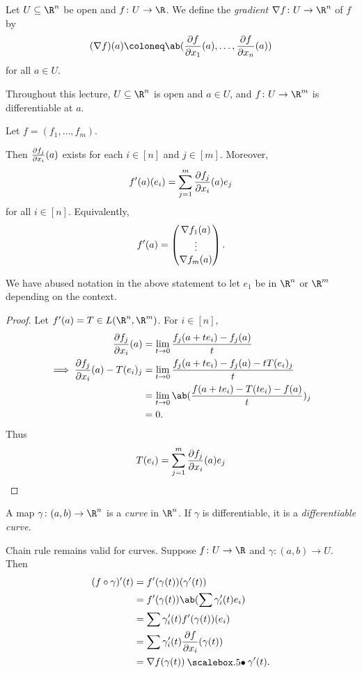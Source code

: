 \begin{definition}[gradient] \label{def:gradient}
    Let $U \subseteq \R^n$ be open and $f\colon U \to \R$.
    We define the \emph{gradient} $\grad f\colon U \to \R^n$ of $f$ by \[
        (\grad f)(a) \coloneq
        \ab(\pdv{f}{x_1}(a), \ldots, \pdv{f}{x_n}(a))
    \] for all $a \in U$.
\end{definition}
Throughout this lecture, $U \subseteq \R^n$ is open and $a \in U$,
and $f\colon U \to \R^m$ is differentiable at $a$.

\begin{proposition}
    Let $f = (f_1, \dots, f_m)$.

    Then $\pdv{f_j}{x_i}(a)$ exists for each $i \in [n]$ and $j \in [m]$.
    Moreover, \[
        f'(a)(e_i) = \sum_{j=1}^m \pdv{f_j}{x_i}(a) e_j
    \] for all $i \in [n]$.
    Equivalently, \[
        f'(a) = \begin{pmatrix}
            \nabla f_1(a) \\
            \vdots \\
            \nabla f_m(a)
        \end{pmatrix}.
    \]
\end{proposition}
We have abused notation in the above statement to let $e_1$ be in
$\R^n$ or $\R^m$ depending on the context.
\begin{proof}
    Let $f'(a) = T \in L(\R^n, \R^m)$.
    For $i \in [n]$, \begin{align*}
        \pdv{f_j}{x_i}(a)
            &= \lim_{t \to 0} \frac{f_j(a+te_i) - f_j(a)}{t} \\
        \implies \pdv{f_j}{x_i}(a) - T(e_i)_j
            &= \lim_{t \to 0} \frac{f_j(a+te_i) - f_j(a) - tT(e_i)_j}{t} \\
            &= \lim_{t \to 0} \ab(\frac{f(a+te_i) - T(te_i) - f(a)}t)_j \\
            &= 0.
    \end{align*}
    Thus \[
        T(e_i) = \sum_{j=1}^m \pdv{f_j}{x_i}(a) e_j \qedhere
    \]
\end{proof}

\begin{definition}[curve] \label{def:curve}
    A map $\gamma\colon (a, b) \to \R^n$ is a \emph{curve} in $\R^n$.
    If $\gamma$ is differentiable, it is a \emph{differentiable curve}.
\end{definition}

\begin{remark}
    Chain rule remains valid for curves.
    Suppose $f\colon U \to \R$ and $\gamma\colon (a, b) \to U$.
    Then \begin{align*}
        (f \circ \gamma)'(t) &= f'(\gamma(t))(\gamma'(t)) \\
        &= f'(\gamma(t)) \ab(\sum \gamma_i'(t) e_i) \\
        &= \sum \gamma_i'(t) f'(\gamma(t))(e_i) \\
        &= \sum \gamma_i'(t) \pdv{f}{x_i}(\gamma(t)) \\
        &= \grad f(\gamma(t)) \dotp \gamma'(t).
    \end{align*}
\end{remark}

